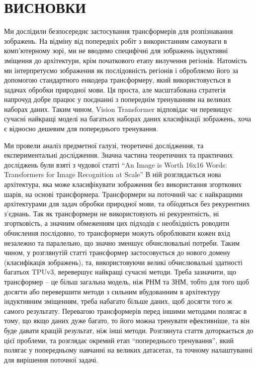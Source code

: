 \documentclass[a4paper,14pt]{extreport}
\newcommand\uchapter[1]{%
  \chapter*{#1}%
  \addcontentsline{toc}{chapter}{#1}}
\begin{document}
\newpage


\newpage


\newpage


\uchapter{ВИСНОВКИ}
Ми дослідили безпосереднє застосування трансформерів для розпізнавання
зображень. На відміну від попередніх робіт з використанням
самоуваги в комп'ютерному зорі, ми не вводимо специфічні для
зображень індуктивні зміщення до
архітектури, крім початкового етапу вилучення регіонів.
Натомість ми інтерпретуємо зображення як послідовність регіонів
і обробляємо його за допомогою стандартного енкодера трансформеру,
який використовується в задачах обробки природної мови.
Ця проста, але масштабована стратегія напрочуд добре працює у поєднанні
з попереднім тренуванням на великих наборах даних.
Таким чином, Vision Transformer відповідає чи перевищує сучасні найкращі
моделі на багатьох наборах даних класифікації зображень,
хоча є відносно дешевим для попереднього тренування.
\cite{image-worth-16-16-words}

Ми провели аналіз предметної галузі, теоретичні дослідження,
та експериментальні дослідження. Значна частина теоретичних
та практичних досліджень були взяті з чудової статті
``An Image is Worth 16x16 Words: Transformers for Image
Recognition at Scale''
В ній розглядається нова архітектура, яка може класифікувати
зображення без використання згорткових шарів, на основі трансформера.
Трансформери на поточний час є найкращими архітектурами для
задач обробки природної мови, та обїодяться без рекурентних
з'єднань. Так як трансформери не використовують ні рекурентність,
ні згортковість, а значним обмеженням цих підходів є
необхідність роводити обчислення послідовно, то трансформери
можуть оброблювати кожен вхід незалежно та паралельно,
що значно зменшує обчислювальні потреби. Таким чином,
у розглянутій статті трансформер застосовується до
нового домену (класифікація зображень), та, використовуючи
великі обчислювальні здатності багатьох TPUv3, веревершує
найкращі сучасні методи. Треба зазначити, що трансформер --
це більш загальна модель, ніж РНМ та ЗНМ, тобто
для того щоб досягти або перевершити методи
з сильним вбудованним в архітектуру індуктивним зміщенням,
треба набагато більше даних, щоб досягти того ж самого результату.
Перевагою трансформерів перед іншими методами полягає в тому,
що якщо даних дуже багато, то його можна тренувати
ефективніше, та він буде давати кращій результат, ніж інші методи.
Розглянута стаття доторкається до цієї проблеми, та розглядає
окремий етап ``попереднього тренування'', який полягає у
попередньому навчанні на великих датасетах, та точному налаштуванні
для вирішення поточної задачі.
\end{document}
